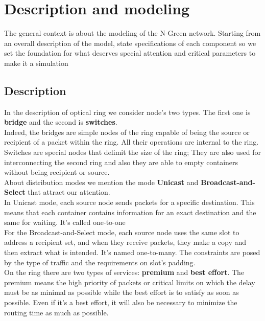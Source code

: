 \documentclass{article}
\begin{document}
\tableofcontents
\pagebreak
\section{Description and modeling}
The general context is about the modeling of the N-Green network. Starting from an overall description of the model, state specifications of each component so we set the foundation for what deserves special attention and critical parameters to make it a simulation


\subsection{Description}
In the description of optical ring we consider node's two types. The first one is \textbf{bridge} and the second is\textbf{ switches}.\\
Indeed, the bridges are simple nodes of the ring capable of being the source or recipient of a packet within the ring. All their operations are internal to the ring. Switches are special nodes that delimit the size of the ring; They are also used for interconnecting the second ring and also they are able to empty containers without being recipient or source.\\ 

About  distribution modes we  mention the mode \textbf{Unicast} and \textbf{Broadcast-and-Select} that attract our attention.\\  In Unicast mode, each source node sends packets for a specific destination. This means that each container contains information for an exact destination and the same for waiting. It's called one-to-one\\For the Broadcast-and-Select mode, each source node uses the same slot to address a recipient set, and when they receive packets, they make a copy and then extract what is intended. It's named  one-to-many. The constraints are posed by the type of traffic and the requirements on slot's padding.\\ 

On the ring there are two types of services: \textbf{premium} and \textbf{best effort}. The premium means the high priority of packets or critical limits on which the delay must be as minimal as possible while the best effort is to satisfy as soon as possible. Even if it's a best effort, it will also be necessary to minimize the routing time as much as possible.\\
\end{document}

